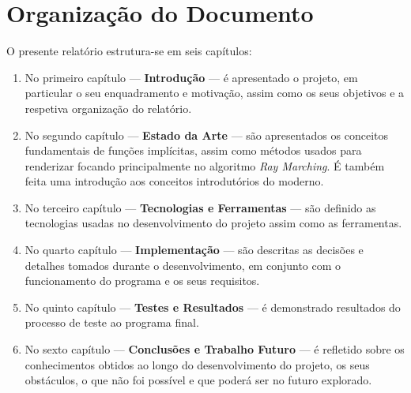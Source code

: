 \section{Organização do Documento}
\label{sec::intro:orgdoc}

O presente relatório estrutura-se em seis capítulos:

\begin{enumerate}
	\item No primeiro capítulo --- \textbf{Introdução} --- é apresentado o projeto, em particular o seu enquadramento e motivação, assim como os seus objetivos e a respetiva organização do relatório.
	
	\item No segundo capítulo --- \textbf{Estado da Arte} \revision{} --- são apresentados os conceitos fundamentais de funções implícitas, assim como métodos usados para renderizar focando principalmente no algoritmo \textit{Ray Marching}. É também feita uma introdução aos conceitos introdutórios do \opengl moderno.
	
	\item No terceiro capítulo --- \textbf{Tecnologias e Ferramentas} \revision{} --- são definido as tecnologias usadas no desenvolvimento do projeto assim como as ferramentas.
	
	\item No quarto capítulo --- \textbf{Implementação} \revision{} --- são descritas as decisões e detalhes tomados durante o desenvolvimento, em conjunto com o funcionamento do programa e os seus requisitos.
	
	\item No quinto capítulo --- \textbf{Testes e Resultados} \revision{} --- é demonstrado resultados do processo de teste ao programa final.
	
	\item No sexto capítulo --- \textbf{Conclusões e Trabalho Futuro} \revision{} --- é refletido sobre os conhecimentos obtidos ao longo do desenvolvimento do projeto, os seus obstáculos, o que não foi possível e que poderá ser no futuro explorado.
\end{enumerate}
